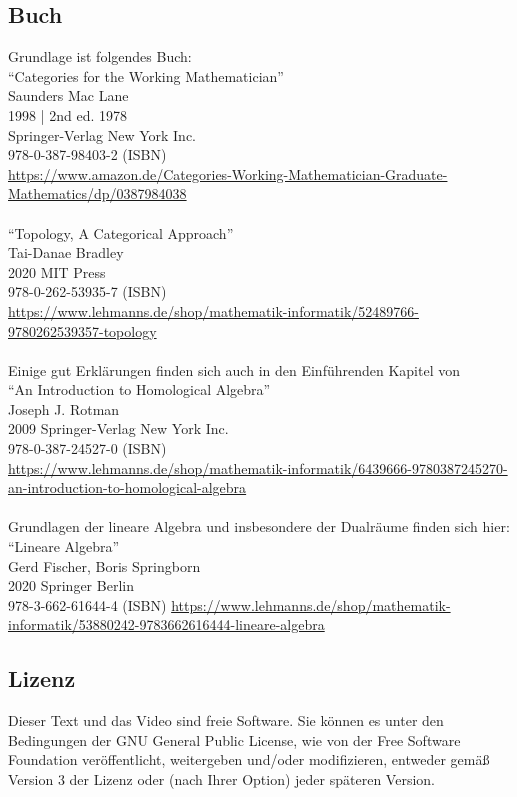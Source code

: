 \documentclass[a4paper]{amsart}
\theoremstyle{definition}
\begin{document}
\subsection*{Buch}
Grundlage ist folgendes Buch:\\
"`Categories for the Working Mathematician"'\\
Saunders Mac Lane\\
1998 | 2nd ed. 1978\\
Springer-Verlag New York Inc.\\
978-0-387-98403-2 (ISBN)\\
{\tiny
   \url{https://www.amazon.de/Categories-Working-Mathematician-Graduate-Mathematics/dp/0387984038}}\\
\\
"`Topology, A Categorical Approach"'\\
Tai-Danae Bradley\\
2020 MIT Press\\
978-0-262-53935-7 (ISBN)\\ 
{\tiny
\url{https://www.lehmanns.de/shop/mathematik-informatik/52489766-9780262539357-topology}}\\
\\
Einige gut Erklärungen finden sich auch in den Einführenden Kapitel von\\
"`An Introduction to Homological Algebra"'\\
Joseph J. Rotman\\
2009 Springer-Verlag New York Inc.\\
978-0-387-24527-0 (ISBN)\\ 
{\tiny \url{https://www.lehmanns.de/shop/mathematik-informatik/6439666-9780387245270-an-introduction-to-homological-algebra}}\\
\\
Grundlagen der lineare Algebra und insbesondere der Dualräume finden sich hier:
"`Lineare Algebra"'\\
Gerd Fischer, Boris Springborn\\
2020 Springer Berlin\\
978-3-662-61644-4 (ISBN)
{\tiny \url{https://www.lehmanns.de/shop/mathematik-informatik/53880242-9783662616444-lineare-algebra}}


\subsection*{Lizenz}
Dieser Text und das Video sind freie Software. Sie können es unter den Bedingungen der 
GNU General Public License, wie von der Free Software Foundation veröffentlicht, weitergeben 
und/oder modifizieren, entweder gemäß Version 3 der Lizenz oder (nach Ihrer Option) jeder späteren Version.
\end{document}
